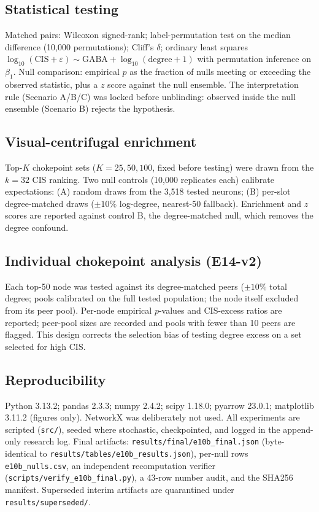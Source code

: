 \subsection{Statistical testing}
Matched pairs: Wilcoxon signed-rank; label-permutation test on the median
difference (10,000 permutations); Cliff's $\delta$; ordinary least squares
$\log_{10}(\mathrm{CIS}+\varepsilon)\sim\mathrm{GABA} +
\log_{10}(\mathrm{degree}+1)$ with permutation inference on $\beta_1$.
Null comparison: empirical $p$ as the fraction of nulls meeting or
exceeding the observed statistic, plus a $z$ score against the null
ensemble. The interpretation rule (Scenario A/B/C) was locked before
unblinding: observed inside the null ensemble (Scenario B) rejects the
hypothesis.

\subsection{Visual-centrifugal enrichment}
Top-$K$ chokepoint sets ($K=25,50,100$, fixed before testing) were drawn
from the $k{=}32$ CIS ranking. Two null controls (10,000 replicates each)
calibrate expectations: (A) random draws from the 3,518 tested neurons;
(B) per-slot degree-matched draws ($\pm10\%$ log-degree, nearest-50
fallback). Enrichment and $z$ scores are reported against control B, the
degree-matched null, which removes the degree confound.

\subsection{Individual chokepoint analysis (E14-v2)}
Each top-50 node was tested against its degree-matched peers ($\pm10\%$
total degree; pools calibrated on the full tested population; the node
itself excluded from its peer pool). Per-node empirical $p$-values and
CIS-excess ratios are reported; peer-pool sizes are recorded and pools
with fewer than 10 peers are flagged. This design corrects the selection
bias of testing degree excess on a set selected for high CIS.

\subsection{Reproducibility}
Python 3.13.2; pandas 2.3.3; numpy 2.4.2; scipy 1.18.0; pyarrow 23.0.1;
matplotlib 3.11.2 (figures only). NetworkX was deliberately not used.
All experiments are scripted (\texttt{src/}), seeded where stochastic,
checkpointed, and logged in the append-only research log. Final artifacts:
\texttt{results/final/e10b\_final.json} (byte-identical to
\texttt{results/tables/e10b\_results.json}), per-null rows
\texttt{e10b\_nulls.csv}, an independent recomputation verifier
(\texttt{scripts/verify\_e10b\_final.py}), a 43-row number audit, and the
SHA256 manifest. Superseded interim artifacts are quarantined under
\texttt{results/superseded/}.
